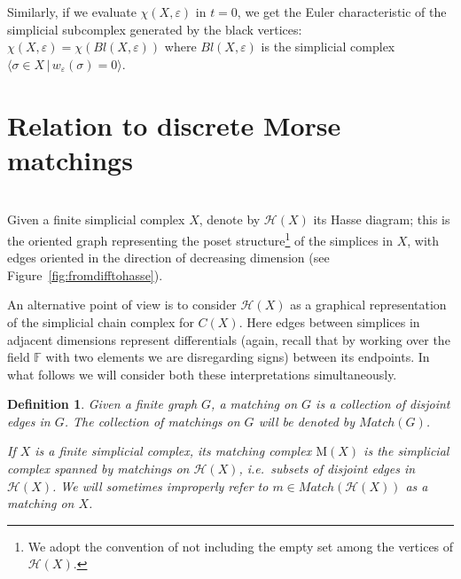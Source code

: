 \documentclass[11pt, a4paper, reqno, twoside, makeidx]{amsart}
\theoremstyle{remark}
\theoremstyle{plain}
\newtheorem{defi}[thm]{Definition}
\theoremstyle{definition}
\newcommand{\F}{\mathbb{F}}
\newcommand{\Mat}{\mathrm{M}}
\newcommand{\hasse}{\mathcal{H}(X)}
\begin{document}
Similarly, if we evaluate $\chi(X, \varepsilon)$ in $t = 0$, we get the Euler characteristic of the simplicial subcomplex generated by the black vertices: $\chi(X, \varepsilon) = \chi(Bl(X, \varepsilon))$ where $Bl(X, \varepsilon)$ is the simplicial complex $\langle \sigma \in X \,|\, w_\varepsilon (\sigma) = 0 \rangle$.
























\section{Relation to discrete Morse matchings}\label{sec:relationtodmm}
~\\
Given a finite simplicial complex $X$, denote by $\hasse$ its Hasse diagram; this is the oriented graph representing the poset structure\footnote{We adopt the convention of not including the empty set among the vertices of $\hasse$.} of the simplices in $X$, with edges oriented in the direction of decreasing dimension (see Figure~\ref{fig:fromdifftohasse}). 

An alternative point of view is to consider $\hasse$ as a graphical representation of the simplicial chain complex for $C(X)$. Here edges between simplices in adjacent dimensions represent differentials (again, recall that by working over the field $\F$ with two elements we are disregarding signs) between its endpoints. In what follows we will consider both these interpretations simultaneously. 

\begin{defi}
Given a finite graph $G$, a \emph{matching on $G$} is a collection of disjoint edges in $G$. The collection of matchings on $G$ will be denoted by $Match(G)$. 

If $X$ is a finite simplicial complex, its  \emph{matching complex} $\Mat (X)$ is the simplicial complex spanned by \emph{matchings} on $\hasse$, \emph{i.e.}~subsets of disjoint edges in $\mathcal{H}(X)$. We will sometimes improperly refer to $m \in Match(\hasse)$ as a matching on $X$.
\end{defi}
\end{document}

